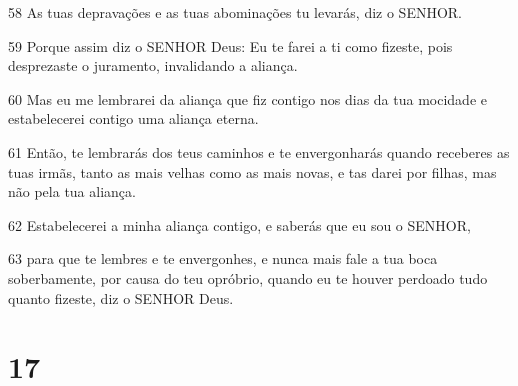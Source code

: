 \par 58 As tuas depravações e as tuas abominações tu levarás, diz o SENHOR.
\par 59 Porque assim diz o SENHOR Deus: Eu te farei a ti como fizeste, pois desprezaste o juramento, invalidando a aliança.
\par 60 Mas eu me lembrarei da aliança que fiz contigo nos dias da tua mocidade e estabelecerei contigo uma aliança eterna.
\par 61 Então, te lembrarás dos teus caminhos e te envergonharás quando receberes as tuas irmãs, tanto as mais velhas como as mais novas, e tas darei por filhas, mas não pela tua aliança.
\par 62 Estabelecerei a minha aliança contigo, e saberás que eu sou o SENHOR,
\par 63 para que te lembres e te envergonhes, e nunca mais fale a tua boca soberbamente, por causa do teu opróbrio, quando eu te houver perdoado tudo quanto fizeste, diz o SENHOR Deus.

\chapter{17}

